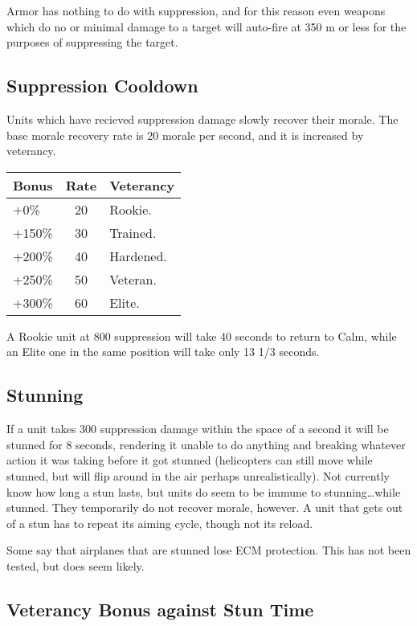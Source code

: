 \documentclass{article}
\begin{document}
Armor has nothing to do with suppression, and for this reason even weapons which
do no or minimal damage to a target will auto-fire at 350 m or less for
the purposes of suppressing the target.

\subsection{Suppression Cooldown}

Units which have recieved suppression damage slowly recover their morale. The
base morale recovery rate is 20 morale per second, and it is increased by
veterancy.

\begin{center}
    \begin{tabular}{ | l | c | l | }
    \hline
    Bonus & Rate & Veterancy \\ \hline
    +0\% & 20 & Rookie. \\
    +150\% & 30 & Trained. \\
    +200\% & 40 & Hardened. \\
    +250\% & 50 & Veteran. \\
    +300\% & 60 & Elite. \\
    \hline
    \end{tabular}
\end{center}

A Rookie unit at 800 suppression will take 40 seconds to return to Calm, while
an Elite one in the same position will take only 13 1/3 seconds.

\subsection{Stunning}

If a unit takes 300 suppression damage within the space of a second it will be
stunned for 8 seconds, rendering it unable to do anything and breaking whatever
action it was taking before it got stunned (helicopters can still move while stunned, but
will flip around in the air perhaps unrealistically). Not currently know how
long a stun lasts, but units do seem to be immune to stunning\ldots while
stunned. They temporarily do not recover morale, however. A unit that gets out
of a stun has to repeat its aiming cycle, though not its reload.

Some say that airplanes that are stunned lose ECM protection. This has not been
tested, but does seem likely.

\subsection{Veterancy Bonus against Stun Time}
\end{document}

